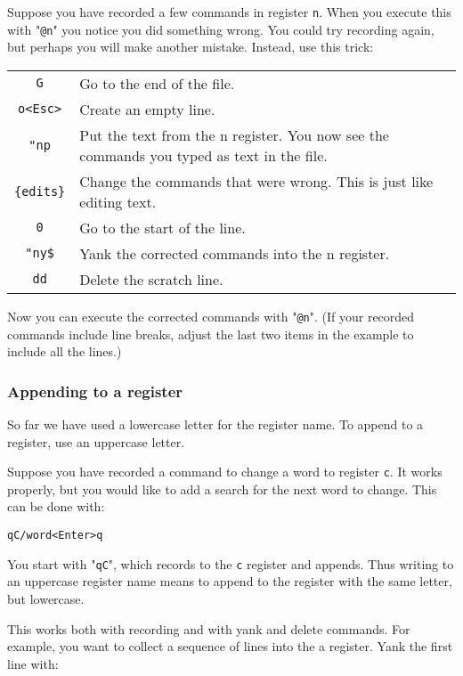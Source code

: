 Suppose you have recorded a few commands in register \verb!n!.
When you execute this with "\verb!@n!" you notice you did something wrong.
You could try recording again, but perhaps you will make another mistake.
Instead, use this trick:

\begin{center}\begin{longtable}{c l}
				\verb!G! & Go to the end of the file. \\
				\verb!o<Esc>! & Create an empty line. \\
				\verb!"np! & Put the text from the n register.  You now see the commands you typed as text in the file. \\
				\verb!{edits}! & Change the commands that were wrong.  This is just like editing text. \\
				\verb!0! & Go to the start of the line. \\
				\verb!"ny$! & Yank the corrected commands into the n register. \\
				\verb!dd! & Delete the scratch line. \\
\end{longtable}\end{center}

Now you can execute the corrected commands with "\verb!@n!".
(If your recorded commands include line breaks, adjust the last two items in the example to include all the lines.)
\subsubsection{Appending to a register}
So far we have used a lowercase letter for the register name.
To append to a register, use an uppercase letter.

Suppose you have recorded a command to change a word to register \verb!c!.
It works properly, but you would like to add a search for the next word to change.
This can be done with:

\begin{Verbatim}[samepage=true]
 qC/word<Enter>q
\end{Verbatim}

You start with "\verb!qC!", which records to the \verb!c! register and appends.
Thus writing to an uppercase register name means to append to the register with the same letter, but lowercase.

This works both with recording and with yank and delete commands.
For example, you want to collect a sequence of lines into the a register.
Yank the first line with:

